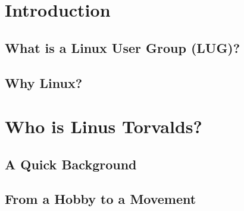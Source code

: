 


\newcommand{\sessionnumber}{1}
\newcommand{\sessiontitle}{Introduction to Linux and Open Source}
\newcommand{\sessiondate}{\today}
\newcommand{\sessionabstract}{This document serves as the first installment in the Linux User Group document series, providing a comprehensive introduction to Linux, its history, and the open-source ecosystem. Topics covered include the biography of Linus Torvalds, the evolution of the Linux kernel, version control with Git, and an overview of popular Linux distributions.}


	
    \maketitle
    
    \makeabstract
    
    \vfill
    
    \makelicense
    
    \newpage
    
    \tableofcontents
    \newpage
    
    
    
    \section{Introduction}
    \subsection{What is a Linux User Group (LUG)?}
    \subsection{Why Linux?}
    
    \section{Who is Linus Torvalds?}
    \subsection{A Quick Background}
    \subsection{From a Hobby to a Movement}
    
